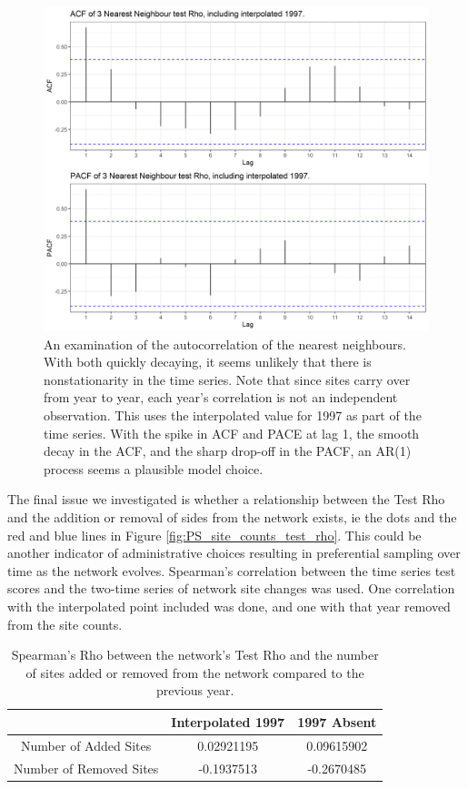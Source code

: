 \documentclass{article}
\begin{document}
\begin{figure}
\centering
\includegraphics[width = \textwidth]{Figures/PreferentialSampling/test_rho_acf_pacf_interp1997.png}
\caption{An examination of the autocorrelation of the nearest neighbours.  With both quickly decaying, it seems unlikely that there is nonstationarity in the time series.   Note that since sites carry over from year to year, each year's correlation is not an independent observation.  This uses the interpolated value for 1997 as part of the time series.  With the spike in ACF and PACE at lag 1, the smooth decay in the ACF, and the sharp drop-off in the PACF, an AR(1) process seems a plausible model choice.}
\label{fig:test_rho_acf_pacf}
\end{figure}

The final issue we investigated is whether a  relationship between the Test Rho and the addition or removal of sides from the network exists, ie the dots and the red and blue lines in Figure \ref{fig:PS_site_counts_test_rho}.  This could be another indicator of administrative choices resulting in preferential sampling over time as the network evolves.  Spearman's correlation between the time series test scores and the two-time series of network site changes was used.   One correlation with the interpolated point included was done, and one with that year removed from the site counts.

\begin{table}[ht]
\centering
\begin{tabular}{c|c|c}
	
	&  Interpolated 1997 & 1997 Absent\\
	\hline
	Number of Added Sites & 0.02921195 & 0.09615902 \\
	Number of Removed Sites & -0.1937513 & -0.2670485
\end{tabular}
\caption{Spearman's Rho between the network's Test Rho and the number of sites added or removed from the network compared to the previous year.}
\label{tab:testRho_siteChange}
\end{table}
\end{document}

